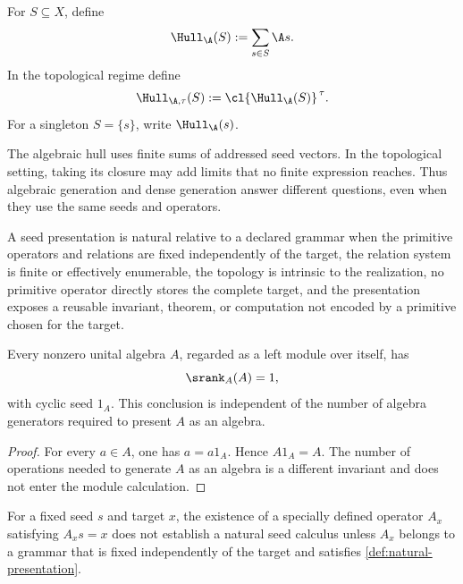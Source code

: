 \begin{definition}
\label{def:generated-hull}
For $S\subseteq X$, define
\[
\Hull_{\A}(S):=\sum_{s\in S}\A s.
\]
In the topological regime define
\[
\Hull_{\A,\tau}(S):=\cl{\Hull_{\A}(S)}^{\,\tau}.
\]
For a singleton $S=\{s\}$, write $\Hull_{\A}(s)$.
\end{definition}

The algebraic hull uses finite sums of addressed seed vectors.  In the topological setting, taking its closure may add limits that no finite expression reaches.  Thus algebraic generation and dense generation answer different questions, even when they use the same seeds and operators.

\begin{definition}
\label{def:natural-presentation}
A seed presentation is natural relative to a declared grammar when the primitive operators and relations are fixed independently of the target, the relation system is finite or effectively enumerable, the topology is intrinsic to the realization, no primitive operator directly stores the complete target, and the presentation exposes a reusable invariant, theorem, or computation not encoded by a primitive chosen for the target.
\end{definition}

\begin{proposition}
\label{prop:algebra-module-generation}
Every nonzero unital algebra $A$, regarded as a left module over itself, has
\[
\srank_A(A)=1,
\]
with cyclic seed $1_A$.  This conclusion is independent of the number of algebra generators required to present $A$ as an algebra.
\end{proposition}

\begin{proof}
For every $a\in A$, one has $a=a1_A$.  Hence $A1_A=A$.  The number of operations needed to generate $A$ as an algebra is a different invariant and does not enter the module calculation.
\end{proof}

\begin{boundary}
\label{bnd:target-dependent-operators}
For a fixed seed $s$ and target $x$, the existence of a specially defined operator $A_x$ satisfying $A_xs=x$ does not establish a natural seed calculus unless $A_x$ belongs to a grammar that is fixed independently of the target and satisfies \cref{def:natural-presentation}.
\end{boundary}

